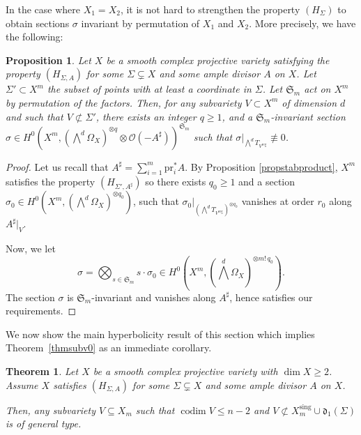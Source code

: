 \documentclass[JEP,XML,SOM,Unicode, NoEqCountersInSection,NoFloatCountersInSection,published]{cedram}
\let\mathcal\mathscr
\newcommand{\pr}{\mathrm{pr}}
\newcommand{\reg}{\mathrm{reg}}
\newcommand{\sing}{\mathrm{sing}}
\DeclareMathOperator{\codim}{codim}
\theoremstyle{theorem}
\newtheorem{theorem}{Theorem}
\newtheorem{proposition}{Proposition} [section]
\theoremstyle{definition}
\begin{document}
In the case where $X_1 = X_2$, it is not hard to strengthen the property $(H_\Sigma)$ to obtain sections $\sigma$ invariant by permutation of $X_1$ and $X_2$. More precisely, we have the following:

\begin{proposition} \label{propsectinv}
Let $X$ be a smooth complex projective variety satisfying the property $(H_{\Sigma, A})$ for some $\Sigma \subsetneq X$ and some ample divisor $A$ on $X$. Let $\Sigma' \subset X^m$ the subset of points with at least a coordinate in $\Sigma$. Let $\mathfrak{S}_m$ act on $X^m$ by permutation of the factors. Then, for any subvariety $V \subset X^m$ of dimension $d$ and such that $V \not\subset \Sigma'$, there exists an integer $q \geq 1$, and a $\mathfrak{S}_m$-invariant section $\sigma \in H^0(X^m, (\bigwedge^d \Omega_X)^{\otimes q} \otimes \mathcal O(-A^\sharp))^{\mathfrak{S}_m}$ such that $\sigma|_{\bigwedge^d T_{V^\reg}} \not\equiv 0$.
\end{proposition}
\begin{proof}
Let us recall that $A^\sharp = \sum_{i=1}^m \pr_i^\ast A$. By Proposition \ref{propstabproduct}, $X^m$ satisfies the property $(H_{\Sigma', A^{\sharp}})$ so there exists $q_0 \geq 1$ and a section $\sigma_0 \in H^0(X^m, (\bigwedge^d \Omega_X)^{\otimes q_0})$, such that $\sigma_0|_{(\bigwedge^d T_{V^\reg})^{\otimes q_0}}$ vanishes at order $r_0$ along $A^\sharp|_{V}$.

Now, we let
\[
\sigma = \bigotimes_{s \in \mathfrak S_m} s \cdot \sigma_0 \in H^0(X^m, (\bigwedge^d \Omega_X)^{\otimes m!\, q_0}).
\]
The section $\sigma$ is $\mathfrak{S}_m$-invariant and vanishes along $A^\sharp$, hence satisfies our requirements.
\end{proof}

We now show the main hyperbolicity result of this section which implies Theorem~\ref{thmsubv0} as an immediate corollary.

\begin{theorem} \label{thmsubv}
Let $X$ be a smooth complex projective variety with $\dim X \geq 2$. Assu\-me $X$ satisfies $(H_{\Sigma, A})$ for some $\Sigma \subsetneq X$ and some ample divisor $A$ on $X$.

Then, any subvariety $V \subseteq X_m$ such that $\codim  V \leq n - 2$ and $V \not\subset X_m^{\sing} \cup \mathfrak d_1(\Sigma)$ is of general type.
\end{theorem}
\end{document}
